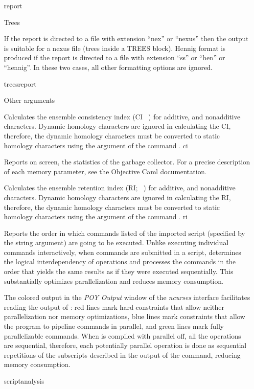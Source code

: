 \begin{command}{report}{}
\begin{arguments}
\begin{argumentgroup}{Trees}
{\begin{description}
\end{description}

If the report is directed to a file with extension ``nex'' or ``nexus'' then
the output is suitable for a nexus file (trees inside a TREES
block). Hennig format is produced if the report is directed
to a file with extension ``ss'' or ``hen'' or ``hennig''. In
these two cases, all other formatting options are ignored.}
{treesreport}

\end{argumentgroup}

\begin{argumentgroup}{Other arguments}
{} 

{Calculates the ensemble consistency index (CI ~\cite{farris1989,
klugeandfarris1969}) for additive, and nonadditive
characters. Dynamic homology characters are ignored in calculating
the CI, therefore, the dynamic homology characters must be converted
to static homology characters using the argument  
of the command .}
{ci}

{Reports on screen, the statistics of
the garbage collector. For a precise description of each memory parameter, see
the Objective Caml documentation.}
{}

{Calculates the ensemble retention index (RI; ~\cite{farris1989}) for additive, and
nonadditive characters. Dynamic homology characters are ignored in calculating
the RI, therefore, the dynamic homology characters must be converted
to static homology characters using the argument  
of the command .}
{ri}

{Reports the order in which commands listed of the imported
script (specified by the string argument) are going to be executed.
Unlike executing individual commands interactively, when commands are submitted in a 
script, \poy determines the logical interdependency of operations
and processes the commands in the order that yields the same
results as if they were executed sequentially. This substantially
optimizes parallelization and reduces memory consumption.

\setlength{\parindent}{0.5cm}                
\indent 
The colored output in the \emph{POY Output} window of the \emph{ncurses}
interface facilitates reading the output of :
red lines mark hard constraints that allow neither
parallelization nor memory optimizations, blue lines mark 
constraints that allow the program to pipeline commands in
parallel, and green lines mark fully parallelizable commands. When \poy
is compiled with parallel off, all the operations are
sequential, therefore, each potentially parallel operation is
done as sequential repetitions of the subscripts described in
the output of the command, reducing memory consumption.}
{scriptanalysis}


\end{argumentgroup}
\end{arguments}
\end{command}
